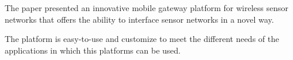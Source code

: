 The paper presented an innovative mobile gateway platform for wireless sensor networks
that offers the ability to interface sensor networks in a novel way.



The platform is easy-to-use and customize to meet the different needs of the applications in which this platforms can be used.


